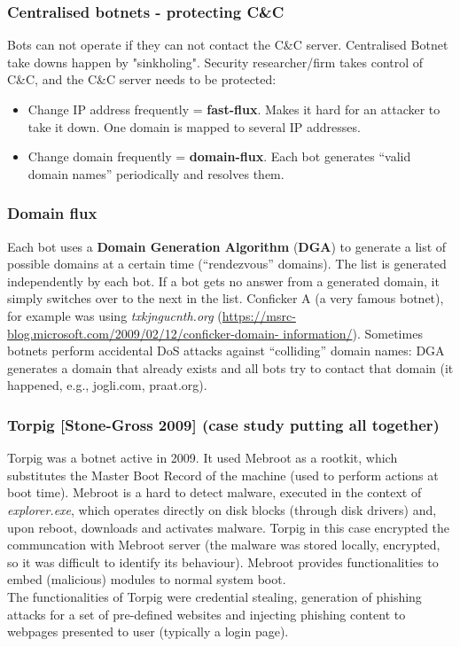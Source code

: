 \documentclass[a4paper, 10pt, titlepage]{article}
\begin{document}
\subsubsection*{Centralised botnets - protecting C\&C}
Bots can not operate if they can not contact the C\&C server. Centralised Botnet take downs happen by "sinkholing". Security researcher/firm takes control of C\&C, and the C\&C server needs to be protected:
\begin{itemize}
	\item Change IP address frequently = \textbf{fast-flux}. Makes it hard for an attacker to take it down. One domain is mapped to several IP addresses.
	\item Change domain frequently = \textbf{domain-flux}. Each bot generates “valid domain names” periodically and resolves them.
\end{itemize}

\subsubsection*{Domain flux}
Each bot uses a \textbf{Domain Generation Algorithm} (\textbf{DGA}) to generate a list of possible domains at a certain time (“rendezvous” domains). The list is generated independently by each bot. If a bot gets no answer from a generated domain, it simply switches over to the next in the list.
Conficker A (a very famous botnet), for example was using \textit{txkjngucnth.org} (\url{https://msrc-blog.microsoft.com/2009/02/12/conficker-domain-
	information/}). 
Sometimes botnets perform accidental DoS attacks against “colliding” domain names: DGA generates a domain that already exists and all bots try to contact that domain (it happened, e.g., jogli.com, praat.org).

\subsubsection{Torpig [Stone-Gross 2009] (case study putting all together)}
Torpig was a botnet active in 2009. It used Mebroot as a rootkit, which substitutes the Master Boot Record of the machine (used to perform actions at boot time). Mebroot is a hard to detect malware, executed in the context of \textit{explorer.exe}, which operates directly on disk blocks (through disk drivers) and, upon reboot, downloads and activates malware. Torpig in this case encrypted the communcation with Mebroot server (the malware was stored locally, encrypted, so it was difficult to identify its behaviour). Mebroot provides functionalities to embed (malicious) modules to normal system boot. \medskip\\
The functionalities of Torpig were credential stealing, generation of phishing attacks for a set of pre-defined websites and injecting phishing content to webpages presented to user (typically a login page). 
\end{document}
